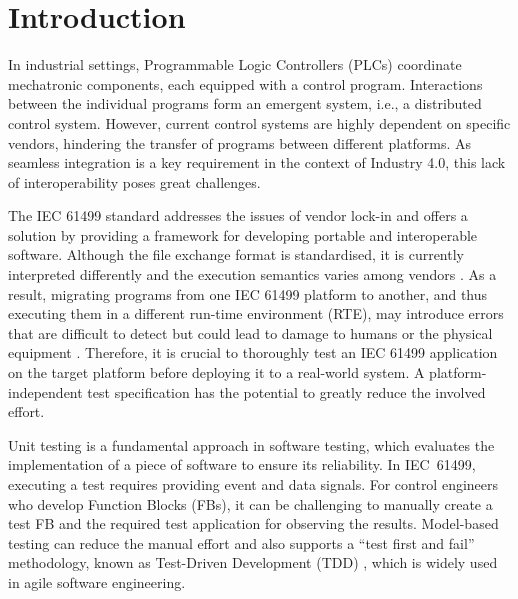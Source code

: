 \documentclass[conference]{IEEEtran}
\begin{document}
\section{Introduction}

In industrial settings, Programmable Logic Controllers (PLCs) coordinate mechatronic components, each equipped with a control program. Interactions between the individual programs form an emergent system, i.e., a distributed control system. However, current control systems are highly dependent on specific vendors, hindering the transfer of programs between different platforms. As seamless integration is a key requirement in the context of Industry 4.0, this lack of interoperability poses great challenges.

The IEC 61499 standard \cite{61499} addresses the issues of vendor lock-in and offers a solution by providing a framework for developing portable and interoperable software. Although the file exchange format is standardised, it is currently interpreted differently and the execution semantics varies among vendors \cite{christensen.2012,Thramboulidis.2009}. As a result, migrating programs from one IEC 61499 platform to another, and thus executing them in a different run-time environment (RTE), may introduce errors that are difficult to detect but could lead to damage to humans or the physical equipment \cite{Testing_Midhun}. Therefore, it is crucial to thoroughly test an IEC 61499 application on the target platform before deploying it to a real-world system. A platform-independent test specification has the potential to greatly reduce the involved effort.

Unit testing is a fundamental approach in software testing, which evaluates the implementation of a piece of software \cite{softwareTesting} to ensure its reliability. In IEC~61499, executing a test requires providing event and data signals. For control engineers who develop Function Blocks (FBs), it can be challenging to manually create a test FB and the required test application for observing the results. Model-based testing can reduce the manual effort and also supports a ``test first and fail'' methodology, known as Test-Driven Development (TDD) \cite{hametner2014}, which is widely used in agile software engineering.
\end{document}
